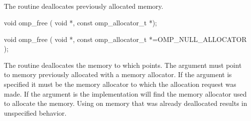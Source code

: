 \subsection{}
\label{subsec:omp_free}

\summary
The  routine deallocates previously allocated memory. 

\format

\begin{cspecific}
\begin{ompcFunction}
void omp_free ( void *, const omp_allocator_t *);
\end{ompcFunction}
\end{cspecific}
\begin{cppspecific}
\begin{ompcFunction}
void omp_free (
  void *,
  const omp_allocator_t *=OMP_NULL_ALLOCATOR
);
\end{ompcFunction}
\end{cppspecific}

\effect

The  routine deallocates the memory to which  points. The  argument must point to memory previously allocated with a memory allocator. If the  argument is specified it must be the memory allocator to which the allocation request was made. If the  argument is  the implementation will find the memory allocator used to allocate the memory. Using  on memory that was already deallocated results in unspecified behavior.

\ccppspecificend
